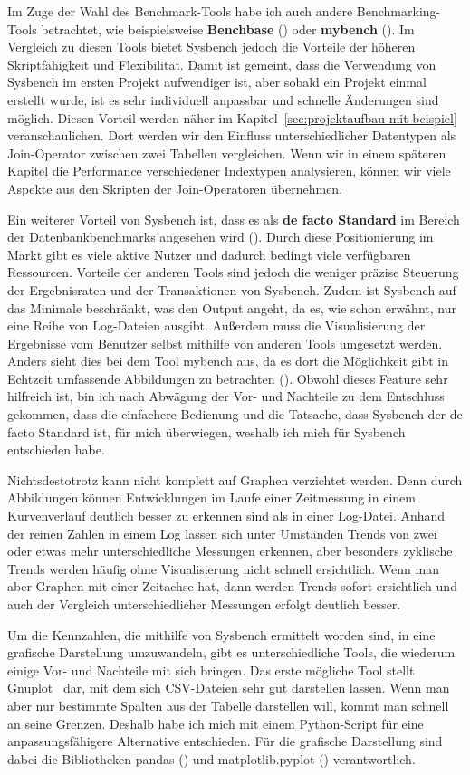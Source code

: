 Im Zuge der Wahl des Benchmark-Tools habe ich auch andere Benchmarking-Tools betrachtet, wie beispielsweise \textbf{Benchbase} (\cite{DifallahPCC13}) oder \textbf{mybench} (\cite{mybench_repo}).
Im Vergleich zu diesen Tools bietet Sysbench jedoch die Vorteile der höheren Skriptfähigkeit und Flexibilität.
Damit ist gemeint, dass die Verwendung von Sysbench im ersten Projekt aufwendiger ist, aber sobald ein Projekt einmal erstellt wurde, ist es sehr individuell anpassbar und schnelle Änderungen sind möglich.
Diesen Vorteil werden näher im Kapitel~\ref{sec:projektaufbau-mit-beispiel} veranschaulichen.
Dort werden wir den Einfluss unterschiedlicher Datentypen als Join-Operator zwischen zwei Tabellen vergleichen.
Wenn wir in einem späteren Kapitel die Performance verschiedener Indextypen analysieren, können wir viele Aspekte aus den Skripten der Join-Operatoren übernehmen.

Ein weiterer Vorteil von Sysbench ist, dass es als \textbf{de facto Standard} im Bereich der Datenbankbenchmarks angesehen wird (\cite{mybench_comparison}).
Durch diese Positionierung im Markt gibt es viele aktive Nutzer und dadurch bedingt viele verfügbaren Ressourcen.
Vorteile der anderen Tools sind jedoch die weniger präzise Steuerung der Ergebnisraten und der Transaktionen von Sysbench.
Zudem ist Sysbench auf das Minimale beschränkt, was den Output angeht, da es, wie schon erwähnt, nur eine Reihe von Log-Dateien ausgibt.
Außerdem muss die Visualisierung der Ergebnisse vom Benutzer selbst mithilfe von anderen Tools umgesetzt werden.
Anders sieht dies bei dem Tool mybench aus, da es dort die Möglichkeit gibt in Echtzeit umfassende Abbildungen zu betrachten (\cite{mybench_user_interface}).
Obwohl dieses Feature sehr hilfreich ist, bin ich nach Abwägung der Vor- und Nachteile zu dem Entschluss gekommen, dass die einfachere Bedienung und die Tatsache, dass Sysbench der de facto Standard ist, für mich überwiegen, weshalb ich mich für Sysbench entschieden habe.

Nichtsdestotrotz kann nicht komplett auf Graphen verzichtet werden.
Denn durch Abbildungen können Entwicklungen im Laufe einer Zeitmessung in einem Kurvenverlauf deutlich besser zu erkennen sind als in einer Log-Datei.
Anhand der reinen Zahlen in einem Log lassen sich unter Umständen Trends von zwei oder etwas mehr unterschiedliche Messungen erkennen, aber besonders zyklische Trends werden häufig ohne Visualisierung nicht schnell ersichtlich.
Wenn man aber Graphen mit einer Zeitachse hat, dann werden Trends sofort ersichtlich und auch der Vergleich unterschiedlicher Messungen erfolgt deutlich besser.

Um die Kennzahlen, die mithilfe von Sysbench ermittelt worden sind, in eine grafische Darstellung umzuwandeln, gibt es unterschiedliche Tools, die wiederum einige Vor- und Nachteile mit sich bringen.
Das erste mögliche Tool stellt Gnuplot~\cite{gnuplot} dar, mit dem sich CSV-Dateien sehr gut darstellen lassen.
Wenn man aber nur bestimmte Spalten aus der Tabelle darstellen will, kommt man schnell an seine Grenzen.
Deshalb habe ich mich mit einem Python-Script für eine anpassungsfähigere Alternative entschieden.
Für die grafische Darstellung sind dabei die Bibliotheken pandas (\cite{reback2020pandas}) und matplotlib.pyplot (\cite{hunter_2007}) verantwortlich.